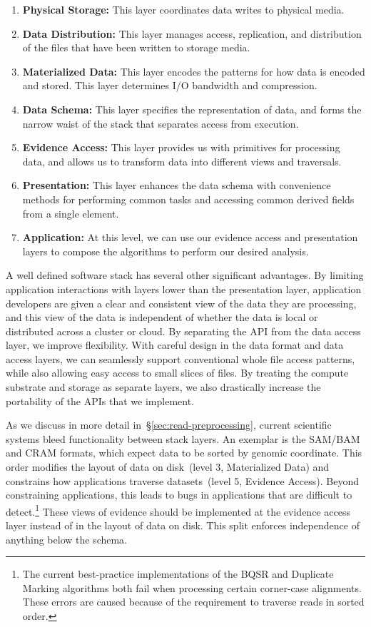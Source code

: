 \documentclass[phd]{ucbthesis}
\begin{document}
\begin{enumerate}
\item \textbf{Physical Storage:} This layer coordinates data writes to physical media.
\item \textbf{Data Distribution:} This layer manages access, replication, and distribution of the files that have
been written to storage media.
\item \textbf{Materialized Data:} This layer encodes the patterns for how data is encoded and stored. This
layer determines I/O bandwidth and compression.
\item \textbf{Data Schema:} This layer specifies the representation of data, and forms the narrow waist of
the stack that separates access from execution.
\item \textbf{Evidence Access:} This layer provides us with primitives for processing data, and allows us to
transform data into different views and traversals.
\item \textbf{Presentation:} This layer enhances the data schema with convenience methods for performing
common tasks and accessing common derived fields from a single element.
\item \textbf{Application:} At this level, we can use our evidence access and presentation layers to compose
the algorithms to perform our desired analysis.
\end{enumerate}

A well defined software stack has several other significant advantages. By limiting application
interactions with layers lower than the presentation layer, application developers are given a clear and
consistent view of the data they are processing, and this view of the data is independent of whether the
data is local or distributed across a cluster or cloud. By separating the API from the data access layer,
we improve flexibility. With careful design in the data format and data access layers, we can seamlessly
support conventional whole file access patterns, while also allowing easy access to small slices of files.
By treating the compute substrate and storage as separate layers, we also drastically increase
the portability of the APIs that we implement.

As we discuss in more detail in~\S\ref{sec:read-preprocessing}, current scientific systems bleed
functionality between stack layers. An exemplar is the SAM/BAM and CRAM formats, which expect data
to be sorted by genomic coordinate. This order modifies the layout of data on disk~(level 3, Materialized Data)
and constrains how applications traverse datasets~(level 5, Evidence Access). Beyond
constraining applications, this leads to bugs in applications that are difficult to detect.\footnote{The
current best-practice implementations of the BQSR and Duplicate Marking algorithms both fail when
processing certain corner-case alignments. These errors are caused because of the requirement to
traverse reads in sorted order.} These views of evidence should be implemented at the evidence
access layer instead of in the layout of data on disk. This split enforces independence of anything below the
schema.
\end{document}
